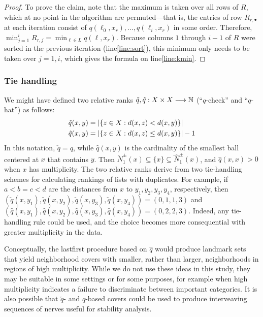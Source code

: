 \documentclass{article}
\begin{document}
\begin{proof}
To prove the claim, note that the maximum is taken over all rows of $R$, which at no point in the algorithm are permuted---that is, the entries of row $R_{r,\bullet}$ at each iteration consist of $q(\ell_0,x_r),\ldots,q(\ell_i,x_r)$ in some order.
Therefore, $\min_{j=1}^{i}{R_{r,j}} = \min_{\ell \in L}{ q(\ell, x_r) }$.
Because columns $1$ through $i-1$ of $R$ were sorted in the previous iteration (line\nbs\ref{line:sort}), this minimum only needs to be taken over $j=1,i$, which gives the formula on line\nbs\ref{line:kmin}.
\end{proof}

\hypertarget{tie-handling}{%
\subsubsection{Tie handling}\label{tie-handling}}

We might have defined two relative ranks
\(\check{q}, \hat{q} : X \times X \longrightarrow \mathbb{N}\)
(``\(q\)-check'' and ``\(q\)-hat'') as follows: \begin{align*}
& \check{q}(x,y)=\abs{\{z\in X \where d(x,z)<d(x,y)\}} \\%
& \hat{q}(x,y)=\abs{\{z\in X \where d(x,z)\leq d(x,y)\}} - 1
\end{align*} In this notation, \(\check{q}=q\), while \(\hat{q}(x,y)\)
is the cardinality of the smallest ball centered at \(x\) that contains
\(y\). Then
\(\check{N}^\pm_1(x) \subseteq \{x\} \subseteq \hat{N}^\pm_1(x)\), and
\(\hat{q}(x,x)>0\) when \(x\) has multiplicity. The two relative ranks
derive from two tie-handling schemes for calculating rankings of lists
with duplicates. For example, if \(a<b=c<d\) are the distances from
\(x\) to \(y_1,y_2,y_3,y_4\), respectively, then
\((\check{q}(x,y_1),\check{q}(x,y_2),\check{q}(x,y_3),\check{q}(x,y_4))=(0,1,1,3)\)
and
\((\hat{q}(x,y_1),\hat{q}(x,y_2),\hat{q}(x,y_3),\hat{q}(x,y_4))=(0,2,2,3)\).
Indeed, any tie-handling rule could be used, and the choice becomes more
consequential with greater multiplicity in the data.

Conceptually, the lastfirst procedure based on \(\hat{q}\) would produce
landmark sets that yield neighborhood covers with smaller, rather than
larger, neighborhoods in regions of high multiplicity. While we do not
use these ideas in this study, they may be suitable in some settings or
for some purposes, for example when high multiplicity indicates a
failure to discriminate between important categories. It is also
possible that \(\check{q}\)- and \(\hat{q}\)-based covers could be used
to produce interveaving sequences of nerves useful for stability
analysis.
\end{document}
